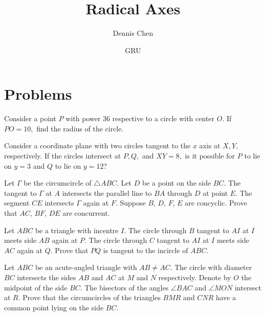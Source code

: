 \documentclass[mast]{lucky}
\title{Radical Axes}
\author{Dennis Chen}
\date{GRU}
\begin{document}
\maketitle



\pagebreak
\section{Problems}

\begin{prob}[]{1}
Consider a point $P$ with power $36$ respective to a circle with center $O.$ If $PO=10,$ find the radius of the circle.
\end{prob}

\begin{prob}[]{2}
Consider a coordinate plane with two circles tangent to the $x$ axis at $X,Y,$ respectively. If the circles intersect at $P,Q,$ and $XY=8,$ is it possible for $P$ to lie on $y=3$ and $Q$ to lie on $y=12?$
\end{prob}

\begin{prob}[APMO 2020/1]{3}
Let $\Gamma$ be the circumcircle of $\triangle ABC$. Let $D$ be a point on the side $BC$. The tangent to $\Gamma$ at $A$ intersects the parallel line to $BA$ through $D$ at point $E$. The segment $CE$ intersects $\Gamma$ again at $F$. Suppose $B$, $D$, $F$, $E$ are concyclic. Prove that $AC$, $BF$, $DE$ are concurrent.

\end{prob}

\begin{prob}[EGMO 2019/4]{3}
Let $ABC$ be a triangle with incentre $I$. The circle through $B$ tangent to $AI$ at $I$ meets side $AB$ again at $P$. The circle through $C$ tangent to $AI$ at $I$ meets side $AC$ again at $Q$. Prove that $PQ$ is tangent to the incircle of $ABC.$
\end{prob}

\begin{prob}[IMO 2004/1]{4}
Let $ABC$ be an acute-angled triangle with $AB\neq AC$. The circle with diameter $BC$ intersects the sides $AB$ and $AC$ at $M$ and $N$ respectively. Denote by $O$ the midpoint of the side $BC$. The bisectors of the angles $\angle BAC$ and $\angle MON$ intersect at $R$. Prove that the circumcircles of the triangles $BMR$ and $CNR$ have a common point lying on the side $BC$.
\end{prob}
\end{document}
